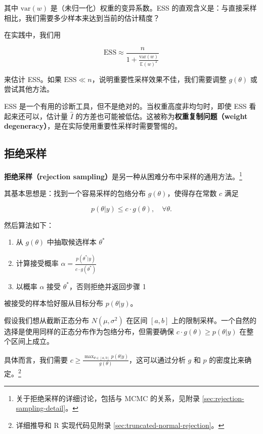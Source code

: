 其中 $\text{var}(w)$ 是（未归一化）权重的变异系数。ESS 的直观含义是：与直接采样相比，我们需要多少样本来达到当前的估计精度？

在实践中，我们用

\[
\text{ESS} \approx \frac{n}{1 + \frac{\text{var}(w)}{\mathbb{E}(w)^2}}
\]

来估计 ESS。如果 $\text{ESS} \ll n$，说明重要性采样效果不佳，我们需要调整 $g(\theta)$ 或尝试其他方法。

\begin{Remark}
  ESS 是一个有用的诊断工具，但不是绝对的。当权重高度非均匀时，即使 ESS 看起来还可以，估计量 $\hat{I}$ 的方差也可能被低估。这被称为\textbf{权重复制问题（weight degeneracy）}，是在实际使用重要性采样时需要警惕的。
\end{Remark}

\subsection{拒绝采样}

\textbf{拒绝采样（rejection sampling）}是另一种从困难分布中采样的通用方法。\footnote{关于拒绝采样的详细讨论，包括与 MCMC 的关系，见附录 \cref{sec:rejection-sampling-detail}。}

其基本思想是：找到一个容易采样的包络分布 $g(\theta)$，使得存在常数 $c$ 满足

\[
p(\theta | y) \leq c \cdot g(\theta), \quad \forall \theta.
\]

然后算法如下：

\begin{enumerate}
  \item 从 $g(\theta)$ 中抽取候选样本 $\theta^*$
  \item 计算接受概率 $\alpha = \frac{p(\theta^* | y)}{c \cdot g(\theta^*)}$
  \item 以概率 $\alpha$ 接受 $\theta^*$，否则拒绝并返回步骤 1
\end{enumerate}

被接受的样本恰好服从目标分布 $p(\theta | y)$。

\begin{Example}[截断正态分布的拒绝采样]\label{ex:truncated-normal-rejection}
  假设我们想从截断正态分布 $N(\mu, \sigma^2)$ 在区间 $[a, b]$ 上的限制采样。一个自然的选择是使用同样的正态分布作为包络分布，但需要确保 $c \cdot g(\theta) \geq p(\theta | y)$ 在整个区间上成立。

  具体而言，我们需要 $c \geq \frac{\max_{\theta \in [a,b]} p(\theta | y)}{g(\theta)}$，这可以通过分析 $g$ 和 $p$ 的密度比来确定。\footnote{详细推导和 R 实现代码见附录 \cref{sec:truncated-normal-rejection}。}
\end{Example}

